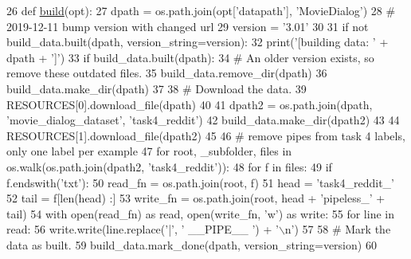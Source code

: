\begin{DoxyCode}
26 \textcolor{keyword}{def }\hyperlink{namespacedialog__babi__feedback_1_1build_a7a9d289f7493a5ded13c4b7f071b6184}{build}(opt):
27     dpath = os.path.join(opt[\textcolor{stringliteral}{'datapath'}], \textcolor{stringliteral}{'MovieDialog'})
28     \textcolor{comment}{# 2019-12-11 bump version with changed url}
29     version = \textcolor{stringliteral}{'3.01'}
30 
31     \textcolor{keywordflow}{if} \textcolor{keywordflow}{not} build\_data.built(dpath, version\_string=version):
32         print(\textcolor{stringliteral}{'[building data: '} + dpath + \textcolor{stringliteral}{']'})
33         \textcolor{keywordflow}{if} build\_data.built(dpath):
34             \textcolor{comment}{# An older version exists, so remove these outdated files.}
35             build\_data.remove\_dir(dpath)
36         build\_data.make\_dir(dpath)
37 
38         \textcolor{comment}{# Download the data.}
39         RESOURCES[0].download\_file(dpath)
40 
41         dpath2 = os.path.join(dpath, \textcolor{stringliteral}{'movie\_dialog\_dataset'}, \textcolor{stringliteral}{'task4\_reddit'})
42         build\_data.make\_dir(dpath2)
43 
44         RESOURCES[1].download\_file(dpath2)
45 
46         \textcolor{comment}{# remove pipes from task 4 labels, only one label per example}
47         \textcolor{keywordflow}{for} root, \_subfolder, files \textcolor{keywordflow}{in} os.walk(os.path.join(dpath2, \textcolor{stringliteral}{'task4\_reddit'})):
48             \textcolor{keywordflow}{for} f \textcolor{keywordflow}{in} files:
49                 \textcolor{keywordflow}{if} f.endswith(\textcolor{stringliteral}{'txt'}):
50                     read\_fn = os.path.join(root, f)
51                     head = \textcolor{stringliteral}{'task4\_reddit\_'}
52                     tail = f[len(head) :]
53                     write\_fn = os.path.join(root, head + \textcolor{stringliteral}{'pipeless\_'} + tail)
54                     with open(read\_fn) \textcolor{keyword}{as} read, open(write\_fn, \textcolor{stringliteral}{'w'}) \textcolor{keyword}{as} write:
55                         \textcolor{keywordflow}{for} line \textcolor{keywordflow}{in} read:
56                             write.write(line.replace(\textcolor{stringliteral}{'|'}, \textcolor{stringliteral}{' \_\_PIPE\_\_ '}) + \textcolor{stringliteral}{'\(\backslash\)n'})
57 
58         \textcolor{comment}{# Mark the data as built.}
59         build\_data.mark\_done(dpath, version\_string=version)
60 \end{DoxyCode}


